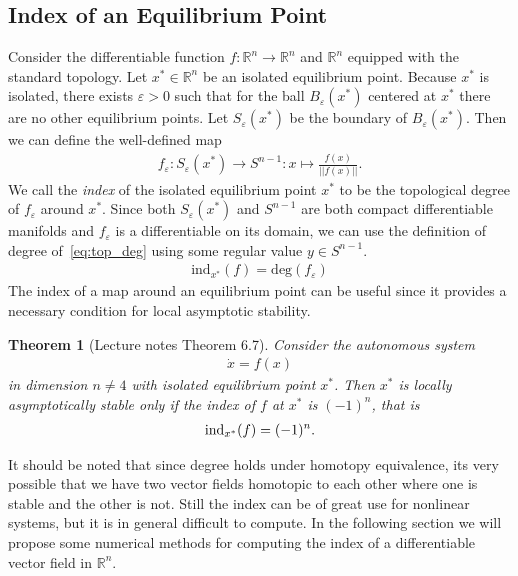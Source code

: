 \documentclass[12pt]{article}
\newtheorem{theorem}{Theorem}[section]
\begin{document}
\subsection{Index of an Equilibrium Point}
Consider the differentiable function $f:\mathbb{R}^n \rightarrow \mathbb{R}^n$ and $\mathbb{R}^n$ equipped with the standard topology. Let $x^*\in\mathbb{R}^n$ be an isolated equilibrium point. Because $x^*$ is isolated, there exists $\varepsilon >0$ such that for the ball $B_{\varepsilon}(x^*)$ centered at $x^*$ there are no other equilibrium points. Let $S_{\varepsilon}(x^*)$ be the boundary of $B_{\varepsilon}(x^*)$. Then we can define the well-defined map 
\begin{align}
f_{\varepsilon} : S_{\varepsilon}(x^*) \rightarrow S^{n-1} : x \mapsto \frac{f(x)}{||f(x)||}.
\end{align}
We call the \textit{index} of the isolated equilibrium point $x^*$ to be the topological degree of $f_{\varepsilon}$ around $x^*$. Since both $S_{\varepsilon}(x^*)$ and $S^{n-1}$ are both compact differentiable manifolds and $f_{\varepsilon}$ is a differentiable on its domain, we can use the definition of degree of~\eqref{eq:top_deg} using some regular value $y \in S^{n-1}$.
\begin{align*}
	\text{ind}_{x^*}(f) = \text{deg} (f_{\varepsilon})
\end{align*}
The index of a map around an equilibrium point can be useful since it provides a necessary condition for local asymptotic stability.
\begin{theorem}[Lecture notes Theorem 6.7]
Consider the autonomous system
\begin{align*}
	\dot x = f(x)
\end{align*}
in dimension $n\neq 4$ with isolated equilibrium point $x^*$. Then $x^*$ is locally asymptotically stable only if the index of $f$ at $x^*$ is $(-1)^n$, that is
\begin{align*}
\textup{ind}_{x^*}(f) = (-1)^n.
\end{align*}
\end{theorem}
It should be noted that since degree holds under homotopy equivalence, its very possible that we have two vector fields homotopic to each other where one is stable and the other is not. Still the index can be of great use for nonlinear systems, but it is in general difficult to compute. In the following section we will propose some numerical methods for computing the index of a differentiable vector field in $\mathbb{R}^n$.
\end{document}
